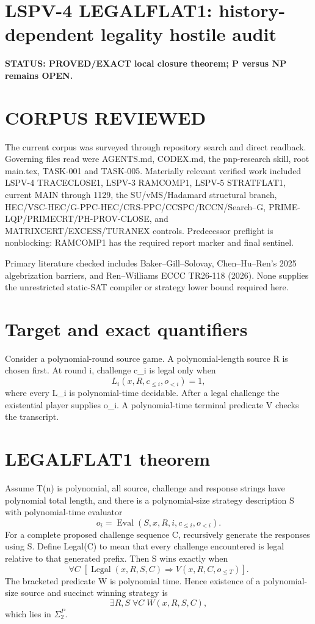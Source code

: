 \documentclass[11pt]{article}
\begin{document}
\section*{LSPV-4 LEGALFLAT1: history-dependent legality hostile audit}

\textbf{STATUS: PROVED/EXACT local closure theorem; P versus NP remains OPEN.}

\section*{CORPUS REVIEWED}
The current corpus was surveyed through repository search and direct readback. Governing files read were AGENTS.md, CODEX.md, the pnp-research skill, root main.tex, TASK-001 and TASK-005. Materially relevant verified work included LSPV-4 TRACECLOSE1, LSPV-3 RAMCOMP1, LSPV-5 STRATFLAT1, current MAIN through 1129, the SU/vMS/Hadamard structural branch, HEC/VSC-HEC/G-PPC-HEC/CRS-PPC/CCSPC/RCCN/Search--G, PRIME-LQP/PRIMECRT/PH-PROV-CLOSE, and MATRIXCERT/EXCESS/TURANEX controls. Predecessor preflight is nonblocking: RAMCOMP1 has the required report marker and final sentinel.

Primary literature checked includes Baker--Gill--Solovay, Chen--Hu--Ren's 2025 algebrization barriers, and Ren--Williams ECCC TR26-118 (2026). None supplies the unrestricted static-SAT compiler or strategy lower bound required here.

\section*{Target and exact quantifiers}
Consider a polynomial-round source game. A polynomial-length source R is chosen first. At round i, challenge c_i is legal only when
\[
L_i(x,R,c_{\le i},o_{<i})=1,
\]
where every L_i is polynomial-time decidable. After a legal challenge the existential player supplies o_i. A polynomial-time terminal predicate V checks the transcript.

\section*{LEGALFLAT1 theorem}
Assume T(n) is polynomial, all source, challenge and response strings have polynomial total length, and there is a polynomial-size strategy description S with polynomial-time evaluator
\[
o_i=\operatorname{Eval}(S,x,R,i,c_{\le i},o_{<i}).
\]
For a complete proposed challenge sequence C, recursively generate the responses using S. Define Legal(C) to mean that every challenge encountered is legal relative to that generated prefix. Then S wins exactly when
\[
\forall C\;[\operatorname{Legal}(x,R,S,C)\Longrightarrow V(x,R,C,o_{\le T})].
\]
The bracketed predicate W is polynomial time. Hence existence of a polynomial-size source and succinct winning strategy is
\[
\boxed{\exists R,S\;\forall C\;W(x,R,S,C)},
\]
which lies in \(\Sigma_2^P\).
\end{document}
